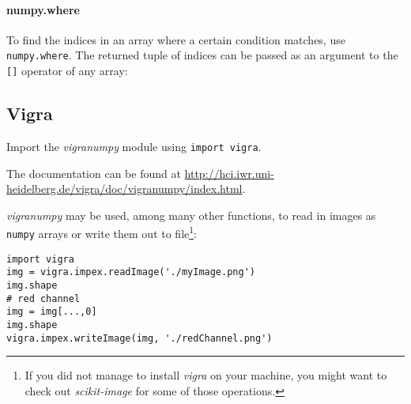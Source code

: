 \documentclass{../uebungsblatt}
\begin{document}
\paragraph{numpy.where}
To find the indices in an array where a certain condition matches, use
\lstinline!numpy.where!. The returned tuple of indices can be passed as an
argument to the \lstinline![]! operator of any array:
\vspace*{-0.5em}

\vspace*{-1.0em}

\subsection*{Vigra}
Import the \emph{vigranumpy} module using \lstinline!import vigra!.

The documentation can be found at 
\url{http://hci.iwr.uni-heidelberg.de/vigra/doc/vigranumpy/index.html}.

\emph{vigranumpy} may be used, among many other functions, to read in images as \lstinline!numpy!
arrays or write them out to file\footnote{If you did not manage to install \emph{vigra} on your machine, you might want to check out \emph{scikit-image} for some of those operations.}:
\vspace*{-0.5em} \begin{lstlisting}
import vigra
img = vigra.impex.readImage('./myImage.png')
img.shape
# red channel
img = img[...,0]
img.shape
vigra.impex.writeImage(img, './redChannel.png')
\end{lstlisting}\vspace*{-0.5em}
\end{document}
